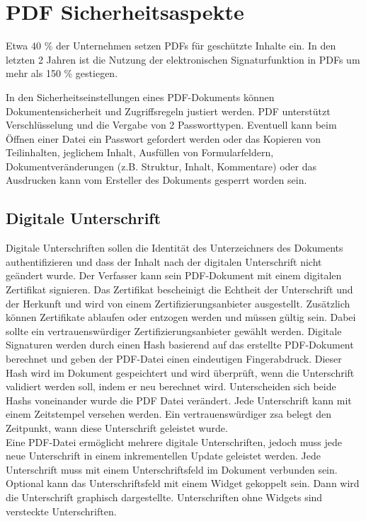 \section{PDF Sicherheitsaspekte}
Etwa 40 \% der Unternehmen setzen PDFs für geschützte Inhalte ein. In den letzten 2 Jahren ist die Nutzung der elektronischen Signaturfunktion in PDFs um mehr als 150 \% gestiegen. \cite{formilo}
\par
In den Sicherheitseinstellungen eines PDF-Dokuments können Dokumentensicherheit und Zugriffsregeln justiert werden. PDF unterstützt Verschlüsselung und die Vergabe von 2 Passworttypen. Eventuell kann beim Öffnen einer Datei ein Passwort gefordert werden oder das Kopieren von Teilinhalten, jeglichem Inhalt, Ausfüllen von Formularfeldern, Dokumentveränderungen (z.B. Struktur, Inhalt, Kommentare) oder das Ausdrucken kann vom Ersteller des Dokuments gesperrt worden sein. 

\subsection{Digitale Unterschrift}
Digitale Unterschriften sollen die Identität des Unterzeichners des Dokuments authentifizieren und dass der Inhalt nach der digitalen Unterschrift nicht geändert wurde. Der Verfasser kann sein PDF-Dokument mit einem digitalen Zertifikat signieren. Das Zertifikat bescheinigt die Echtheit der Unterschrift und der Herkunft und wird von einem Zertifizierungsanbieter ausgestellt. Zusätzlich können Zertifikate ablaufen oder entzogen werden und müssen gültig sein. Dabei sollte ein vertrauenswürdiger Zertifizierungsanbieter gewählt werden. Digitale Signaturen werden durch einen Hash basierend auf das erstellte PDF-Dokument berechnet und geben der PDF-Datei einen eindeutigen Fingerabdruck. Dieser Hash wird im Dokument gespeichtert und wird überprüft, wenn die Unterschrift validiert werden soll, indem er neu berechnet wird. Unterscheiden sich beide Hashs voneinander wurde die PDF Datei verändert. Jede Unterschrift kann mit einem Zeitstempel versehen werden. Ein vertrauenswürdiger \gls{zsa} belegt den Zeitpunkt, wann diese Unterschrift geleistet wurde. \\
Eine PDF-Datei ermöglicht mehrere digitale Unterschriften, jedoch muss jede neue Unterschrift in einem inkrementellen Update geleistet werden. Jede Unterschrift muss mit einem Unterschriftsfeld im Dokument verbunden sein. Optional kann das Unterschriftsfeld mit einem Widget gekoppelt sein. Dann wird die Unterschrift graphisch dargestellte. Unterschriften ohne Widgets sind versteckte Unterschriften. \cite{softx}